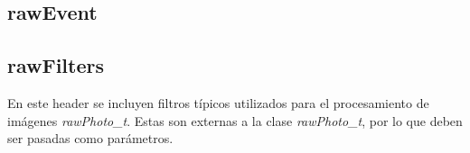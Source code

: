 \documentclass[twoside,twocolumn]{article}
\begin{document}
    \subsection{rawEvent}\label{sec:ap_doc:rawEvent}

    \subsection{rawFilters}\label{sec:ap_doc:rawFilters}

      En este header se incluyen filtros típicos utilizados para el procesamiento de imágenes \emph{rawPhoto\_t}.
      Estas son externas a la clase \emph{rawPhoto\_t}, por lo que deben ser pasadas como parámetros. 
\end{document}
